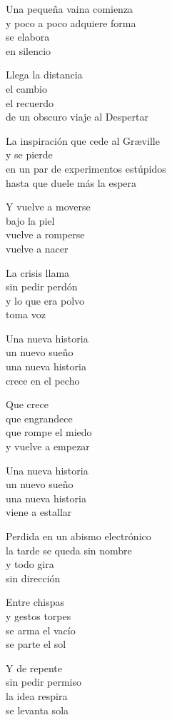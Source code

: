 \begin{lyrics}
Una pequeña vaina comienza\\
y poco a poco adquiere forma\\
se elabora\\
en silencio

Llega la distancia\\
el cambio\\
el recuerdo\\
de un obscuro viaje al Despertar

La inspiración que cede al Græville\\
y se pierde\\
en un par de experimentos estúpidos\\
hasta que duele más la espera

Y vuelve a moverse\\
bajo la piel\\
vuelve a romperse\\
vuelve a nacer

La crisis llama\\
sin pedir perdón\\
y lo que era polvo\\
toma voz

Una nueva historia\\
un nuevo sueño\\
una nueva historia\\
crece en el pecho

Que crece\\
que engrandece\\
que rompe el miedo\\
y vuelve a empezar

Una nueva historia\\
un nuevo sueño\\
una nueva historia\\
viene a estallar

Perdida en un abismo electrónico\\
la tarde se queda sin nombre\\
y todo gira\\
sin dirección

Entre chispas\\
y gestos torpes\\
se arma el vacío\\
se parte el sol

Y de repente\\
sin pedir permiso\\
la idea respira\\
se levanta sola


\end{lyrics}
